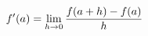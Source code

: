 \documentclass[preview]{standalone}
\begin{document}
\begin{align*}
\special{dvisvgm:raw <g id='unique000'>}f'(a) = \lim_{h \to 0} \frac{f(a+h) - f(a)}{h}\special{dvisvgm:raw </g>}
\end{align*}
\end{document}

